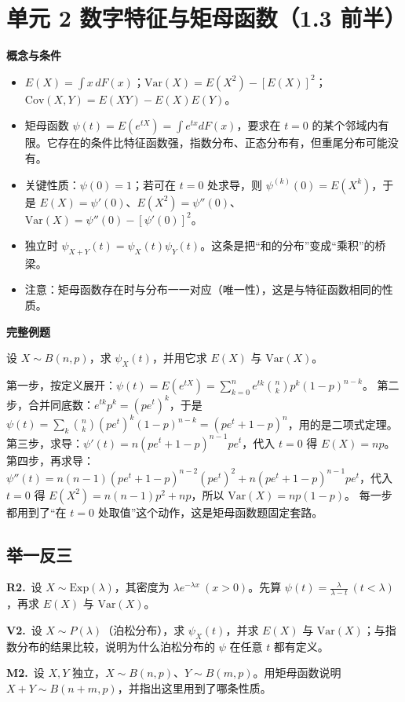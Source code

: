 \documentclass[UTF8,a4paper,11pt]{ctexart}
\newcommand{\CompactQuestion}[2]{\par\noindent\textbf{#1.}\ #2\par\vspace{.8em}}
\begin{document}
\section{单元 2 数字特征与矩母函数（1.3 前半）}
\textbf{概念与条件}

\begin{itemize}
\item $E(X)=\int x\,dF(x)$；$\mathrm{Var}(X)=E(X^2)-[E(X)]^2$；$\mathrm{Cov}(X,Y)=E(XY)-E(X)E(Y)$。
\item 矩母函数 $\psi(t)=E(e^{tX})=\int e^{tx}dF(x)$，要求在 $t=0$ 的某个邻域内有限。它存在的条件比特征函数强，指数分布、正态分布有，但重尾分布可能没有。
\item 关键性质：$\psi(0)=1$；若可在 $t=0$ 处求导，则 $\psi^{(k)}(0)=E(X^k)$，于是 $E(X)=\psi'(0)$、$E(X^2)=\psi''(0)$、$\mathrm{Var}(X)=\psi''(0)-[\psi'(0)]^2$。
\item 独立时 $\psi_{X+Y}(t)=\psi_X(t)\psi_Y(t)$。这条是把“和的分布”变成“乘积”的桥梁。
\item 注意：矩母函数存在时与分布一一对应（唯一性），这是与特征函数相同的性质。
\end{itemize}
\textbf{完整例题}

设 $X\sim B(n,p)$，求 $\psi_X(t)$，并用它求 $E(X)$ 与 $\mathrm{Var}(X)$。

第一步，按定义展开：$\psi(t)=E(e^{tX})=\sum_{k=0}^{n}e^{tk}\binom{n}{k}p^k(1-p)^{n-k}$。 第二步，合并同底数：$e^{tk}p^k=(pe^{t})^k$，于是 $\psi(t)=\sum_{k}\binom{n}{k}(pe^{t})^k(1-p)^{n-k}=(pe^{t}+1-p)^n$，用的是二项式定理。 第三步，求导：$\psi'(t)=n(pe^{t}+1-p)^{n-1}pe^{t}$，代入 $t=0$ 得 $E(X)=np$。 第四步，再求导：$\psi''(t)=n(n-1)(pe^{t}+1-p)^{n-2}(pe^{t})^2+n(pe^{t}+1-p)^{n-1}pe^{t}$，代入 $t=0$ 得 $E(X^2)=n(n-1)p^2+np$，所以 $\mathrm{Var}(X)=np(1-p)$。 每一步都用到了“在 $t=0$ 处取值”这个动作，这是矩母函数题固定套路。

\subsection{举一反三}
\CompactQuestion{R2}{设 $X\sim \mathrm{Exp}(\lambda)$，其密度为 $\lambda e^{-\lambda x}\ (x>0)$。先算 $\psi(t)=\frac{\lambda}{\lambda-t}\ (t<\lambda)$，再求 $E(X)$ 与 $\mathrm{Var}(X)$。}
\CompactQuestion{V2}{设 $X\sim P(\lambda)$（泊松分布），求 $\psi_X(t)$，并求 $E(X)$ 与 $\mathrm{Var}(X)$；与指数分布的结果比较，说明为什么泊松分布的 $\psi$ 在任意 $t$ 都有定义。}
\CompactQuestion{M2}{设 $X,Y$ 独立，$X\sim B(n,p)$、$Y\sim B(m,p)$。用矩母函数说明 $X+Y\sim B(n+m,p)$，并指出这里用到了哪条性质。}
\clearpage
{}
\end{document}

